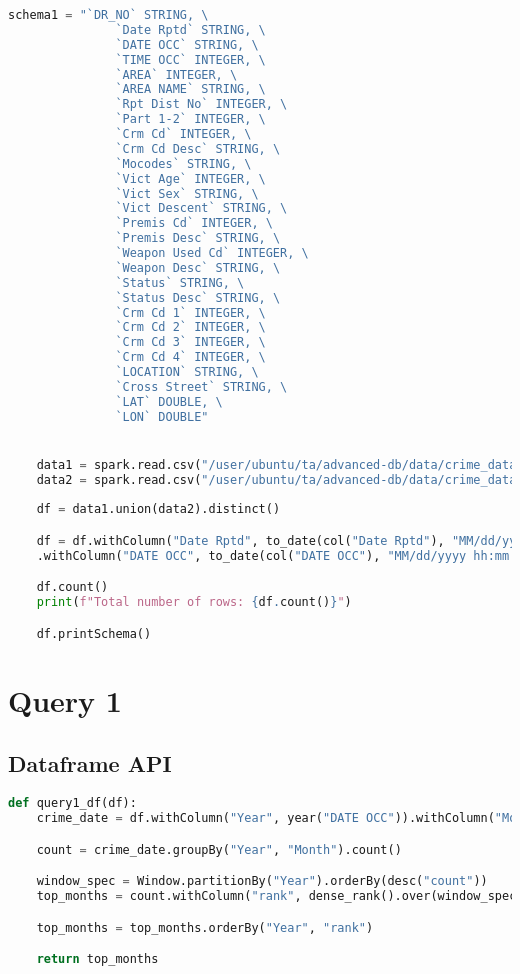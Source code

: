 \documentclass{article}
\begin{document}
\begin{lstlisting}[language = Python]
    schema1 = "`DR_NO` STRING, \
               `Date Rptd` STRING, \
               `DATE OCC` STRING, \
               `TIME OCC` INTEGER, \
               `AREA` INTEGER, \
               `AREA NAME` STRING, \
               `Rpt Dist No` INTEGER, \
               `Part 1-2` INTEGER, \
               `Crm Cd` INTEGER, \
               `Crm Cd Desc` STRING, \
               `Mocodes` STRING, \
               `Vict Age` INTEGER, \
               `Vict Sex` STRING, \
               `Vict Descent` STRING, \
               `Premis Cd` INTEGER, \
               `Premis Desc` STRING, \
               `Weapon Used Cd` INTEGER, \
               `Weapon Desc` STRING, \
               `Status` STRING, \
               `Status Desc` STRING, \
               `Crm Cd 1` INTEGER, \
               `Crm Cd 2` INTEGER, \
               `Crm Cd 3` INTEGER, \
               `Crm Cd 4` INTEGER, \
               `LOCATION` STRING, \
               `Cross Street` STRING, \
               `LAT` DOUBLE, \
               `LON` DOUBLE"


    data1 = spark.read.csv("/user/ubuntu/ta/advanced-db/data/crime_data_2010.csv", header=True, schema=schema1)
    data2 = spark.read.csv("/user/ubuntu/ta/advanced-db/data/crime_data_2020.csv", header=True, schema=schema1)
    
    df = data1.union(data2).distinct()

    df = df.withColumn("Date Rptd", to_date(col("Date Rptd"), "MM/dd/yyyy hh:mm:ss a")) \
    .withColumn("DATE OCC", to_date(col("DATE OCC"), "MM/dd/yyyy hh:mm:ss a"))

    df.count()
    print(f"Total number of rows: {df.count()}")

    df.printSchema()
\end{lstlisting}


\section*{Query 1}

\subsection*{Dataframe API}

\begin{lstlisting}[language = Python]
    def query1_df(df):
    crime_date = df.withColumn("Year", year("DATE OCC")).withColumn("Month", month("DATE OCC"))

    count = crime_date.groupBy("Year", "Month").count()

    window_spec = Window.partitionBy("Year").orderBy(desc("count"))
    top_months = count.withColumn("rank", dense_rank().over(window_spec)).filter(col("rank") <= 3)

    top_months = top_months.orderBy("Year", "rank")

    return top_months
\end{lstlisting}  
\end{document}

